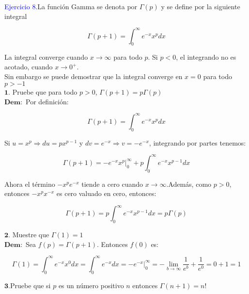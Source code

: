 \textcolor{blue}{Ejercicio 8.}La función Gamma se denota por $\Gamma (p)$ y se define por la siguiente integral

\begin{equation*}
    \Gamma (p+1)= \int_{0}^{\infty} e^{-x}x^{p}dx 
\end{equation*}

La integral converge cuando $x \rightarrow \infty$ para todo $p$. Si $p < 0$, el integrando no es acotado, cuando $x \rightarrow 0^{+}$.\\

Sin embargo se puede demostrar que la integral converge en $x=0$ para todo $p > -1$\\

$\mathbf{1.}$ Pruebe que para todo $p > 0$, $\Gamma (p+1)= p \Gamma (p)$\\

$\mathbf{Dem:}$ Por definición: 

\begin{equation*}
    \Gamma (p+1)= \int_{0}^{\infty} e^{-x} x^{p} dx
\end{equation*}

Si $u= x^p \Rightarrow du= px^{p-1}$ y $dv=e^{-x} \Rightarrow v= -e^{-x}$, integrando por partes tenemos:

\begin{equation*}
    \Gamma(p+1)= -e^{-x}x^p \Big|_{0}^{\infty} +p \int_{0}^{\infty} e^{-x}x^{p-1} dx 
\end{equation*}

Ahora el término $-x^{p}e^{-x}$ tiende a cero cuando $x \rightarrow \infty$.Además, como $p > 0$, entonces $-x^{p}x^{-x}$ es cero valuado en cero, entonces: 

\begin{equation*}
    \Gamma (p+1)= p \int_{0}^{\infty} e^{-x}x^{p-1}dx= p \Gamma (p)
\end{equation*}

$\mathbf{2.}$ Muestre que $\Gamma (1)=1$\\

$\mathbf{Dem:}$ Sea $f(p)= \Gamma (p+1)$. Entonces $f(0)$ es: 

\begin{equation*}
    \Gamma(1)= \int_{0}^{\infty} e^{-x}x^0 dx= \int_{0}^{\infty} e^{-x}dx= -e^{-x} \Big |_{0}^{\infty}=  -\lim_{b\to\infty} \frac{1}{e^b}+ \frac{1}{e^0}= 0+1= 1
\end{equation*}

$\mathbf{3.}$Pruebe que si $p$ es un número positivo $n$ entonces $\Gamma(n+1)= n!$\\

